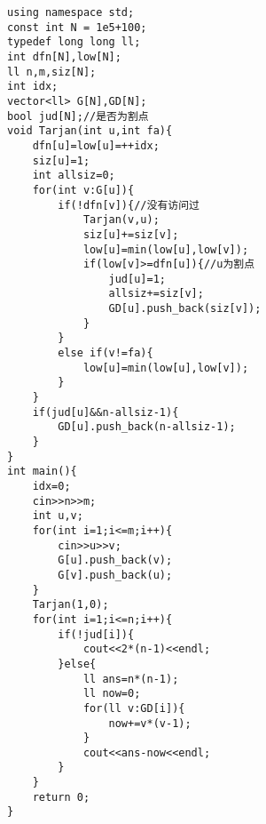 \documentclass[twocolumn,a4]{article}
\begin{document}
\begin{lstlisting}
using namespace std;
const int N = 1e5+100;
typedef long long ll;
int dfn[N],low[N];
ll n,m,siz[N];
int idx;
vector<ll> G[N],GD[N];
bool jud[N];//是否为割点
void Tarjan(int u,int fa){
    dfn[u]=low[u]=++idx;
    siz[u]=1;
    int allsiz=0;
    for(int v:G[u]){
        if(!dfn[v]){//没有访问过
            Tarjan(v,u);
            siz[u]+=siz[v];
            low[u]=min(low[u],low[v]);
            if(low[v]>=dfn[u]){//u为割点
                jud[u]=1;
                allsiz+=siz[v];
                GD[u].push_back(siz[v]);
            }
        }
        else if(v!=fa){
            low[u]=min(low[u],low[v]);
        }
    }
    if(jud[u]&&n-allsiz-1){
        GD[u].push_back(n-allsiz-1);
    }
}
int main(){
    idx=0;
    cin>>n>>m;
    int u,v;
    for(int i=1;i<=m;i++){
        cin>>u>>v;
        G[u].push_back(v);
        G[v].push_back(u);
    }
    Tarjan(1,0);
    for(int i=1;i<=n;i++){
        if(!jud[i]){
            cout<<2*(n-1)<<endl;
        }else{
            ll ans=n*(n-1);
            ll now=0;
            for(ll v:GD[i]){
                now+=v*(v-1);
            }
            cout<<ans-now<<endl;
        }
    }
    return 0;
}
\end{lstlisting}
\end{document}
